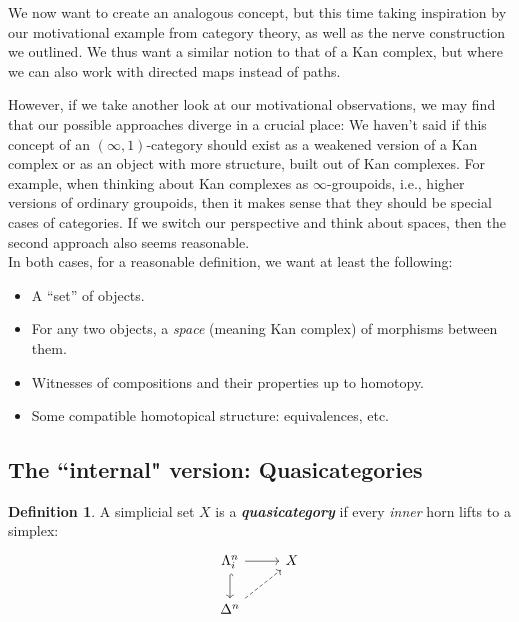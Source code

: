 \documentclass{article}
\newcommand{\textbi}[1]{\textbf{\textit{#1}}}
\theoremstyle{definition}
\newtheorem{defin}[subsection]{Definition}
\begin{document}
We now want to create an analogous concept, but this time taking inspiration by our motivational example from category theory, as well as the nerve construction we outlined. We thus want a similar notion to that of a Kan complex, but where we can also work with directed maps instead of paths. 
\par However, if we take another look at our motivational observations, we may find that our possible approaches diverge in a crucial place: We haven't said if this concept of an $(\infty,1)$-category should exist as a weakened version of a Kan complex or as an object with more structure, built out of Kan complexes. For example, when thinking about Kan complexes as $\infty$-groupoids, i.e., higher versions of ordinary groupoids, then it makes sense that they should be special cases of categories. If we switch our perspective and think about spaces, then the second approach also seems reasonable. \\ 
In both cases, for a reasonable definition, we want at least the following:
\begin{itemize}
    \item A ``set'' of objects.
    \item For any two objects, a \textit{space} (meaning Kan complex) of morphisms between them.
    \item Witnesses of compositions and their properties up to homotopy.
    \item Some compatible homotopical structure: equivalences, etc.
\end{itemize}

\subsection*{The ``internal" version: Quasicategories}

\begin{defin}
    A simplicial set $X$ is a \textbi{quasicategory} if every \textit{inner} horn lifts to a simplex: 
    \[\begin{tikzcd}
        \Lambda^n_i\arrow[r] & X \\ 
        \Delta^n \arrow[from=u, hook] \arrow[ur, dashed]
    \end{tikzcd}\]
\end{defin}
\end{document}
